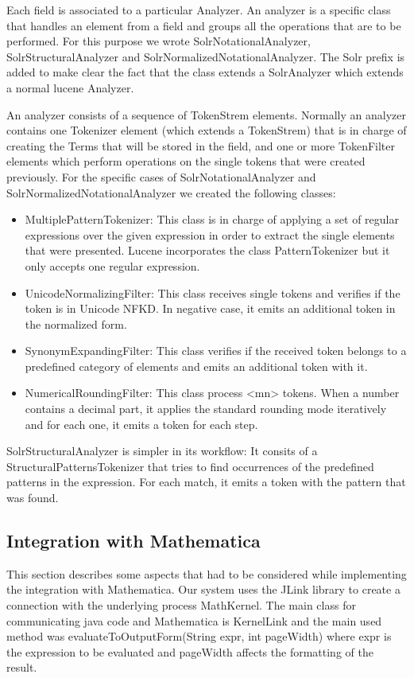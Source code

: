 Each field is associated to a particular {\codefont Analyzer}. An analyzer is a specific class that handles an element from a field and groups all the operations that are to be performed. For this purpose we wrote {\codefont SolrNotationalAnalyzer}, {\codefont SolrStructuralAnalyzer} and {\codefont SolrNormalizedNotationalAnalyzer}. 
The Solr prefix is added to make clear the fact that the class extends a {\codefont SolrAnalyzer} which extends a normal lucene {\codefont Analyzer}. 

An analyzer consists of a sequence of {\codefont TokenStrem} elements. Normally an analyzer contains one {\codefont Tokenizer} element (which extends a {\codefont TokenStrem}) that is in charge of creating the Terms that will be stored in the field, and one or more {\codefont TokenFilter} elements which perform operations on the single tokens that were created previously. For the specific cases of SolrNotationalAnalyzer and SolrNormalizedNotationalAnalyzer we created the following classes: 

\begin{itemize}
\item {\codefont MultiplePatternTokenizer}: This class is in charge of applying a set of regular expressions over the given expression in order to extract the single elements that were presented. Lucene incorporates the class {\codefont PatternTokenizer} but it only accepts one regular expression.
\item {\codefont UnicodeNormalizingFilter}: This class receives single tokens and verifies if the token is in Unicode NFKD. In negative case, it emits an additional token in the normalized form.
\item {\codefont SynonymExpandingFilter}: This class verifies if the received token belongs to a predefined category of elements and emits an additional token with it.
\item {\codefont NumericalRoundingFilter}: This class process {\codefont <mn>} tokens. When a number contains a decimal part, it applies the standard rounding mode iteratively and for each one, it emits a token for each step. 
\end{itemize}

{\codefont SolrStructuralAnalyzer } is simpler in its workflow: It consits of a {\codefont StructuralPatternsTokenizer} that tries to find occurrences of the predefined patterns in the expression. For each match, it emits a token with the pattern that was found. 
\subsection{Integration with Mathematica}
This section describes some aspects that had to be considered while implementing the integration with Mathematica. Our system uses the {\codefont JLink} library to create a connection with the underlying process {\codefont MathKernel}. The main class for communicating java code and {\codefont Mathematica} is {\codefont KernelLink} and the main used method was {\codefont evaluateToOutputForm(String expr, int pageWidth)} where {\codefont expr} is the expression to be evaluated and {\codefont pageWidth} affects the formatting of the result.


